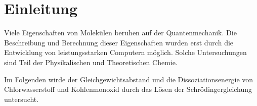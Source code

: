 %
%

\section{Einleitung}


Viele Eigenschaften von Molekülen beruhen auf der Quantenmechanik. Die Beschreibung und Berechnung dieser Eigenschaften wurden erst durch die Entwicklung von leistungsstarken Computern möglich. Solche Untersuchungen sind Teil der Physikalischen und Theoretischen Chemie.

Im Folgenden wirde der Gleichgewichtsabstand und die Dissoziationsenergie von Chlorwasserstoff und Kohlenmonoxid durch das Lösen der Schrödingergleichung untersucht. 








%
